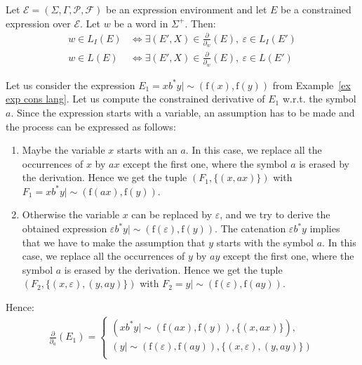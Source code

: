 \documentclass[a4paper]{llncs}
\begin{document}
  \begin{corollary}
    Let $\mathcal{E}=(\Sigma,\Gamma,\mathcal{P},\mathcal{F})$ be an expression environment and let $E$ be a constrained expression over $\mathcal{E}$. Let $w$ be a word in $\Sigma^+$. Then:
        \begin{align*}
          w \in L_{I}(E) &\Leftrightarrow \exists (E',X)\in\frac{\partial}{\partial_w}(E),\ \varepsilon\in L_I(E')\\
          w \in L(E) &\Leftrightarrow \exists (E',X)\in\frac{\partial}{\partial_w}(E),\ \varepsilon\in L(E')
        \end{align*}
  \end{corollary} 
  
  \begin{example}\label{ex derivativ}
    Let us consider the expression $E_1=xb^*y\mid \sim(\mathrm{f}(x),\mathrm{f}(y))$ from Example~\ref{ex exp cons lang}. Let us compute the constrained derivative of $E_1$ w.r.t. the symbol $a$. Since the expression starts with a variable, an assumption has to be made and the process can be expressed as follows: 
    \begin{enumerate}
      \item Maybe the variable $x$ starts with an $a$. In this case, we replace all the occurrences of $x$ by $ax$ except the first one, where the symbol $a$ is erased by the derivation. Hence we get the tuple $(F_1,\{(x,ax)\})$ with $F_1=xb^*y\mid \sim(\mathrm{f}(ax),\mathrm{f}(y))$.
      \item Otherwise the variable $x$ can be replaced by $\varepsilon$, and we try to derive the obtained expression $\varepsilon b^*y\mid \sim(\mathrm{f}(\varepsilon),\mathrm{f}(y))$. The catenation $\varepsilon b^*y$ implies that we have to make the assumption that $y$ starts with the symbol $a$. In this case, we replace all the occurrences of $y$ by $ay$ except the first one, where the symbol $a$ is erased by the derivation. Hence we get the tuple $(F_2,\{(x,\varepsilon),(y,ay)\})$ with $F_2=y\mid \sim(\mathrm{f}(\varepsilon),\mathrm{f}(ay))$.
    \end{enumerate}    
    Hence:
        \begin{align*}
        \frac{\partial}{\partial_a}(E_1)=
      \begin{cases}
          (xb^*y\mid \sim(\mathrm{f}(ax),\mathrm{f}(y)),\{(x,ax)\}),\\
          (y\mid \sim(\mathrm{f}(\varepsilon),\mathrm{f}(ay)),\{(x,\varepsilon),(y,ay)\})\\

\end{cases}
\end{align*}
\end{example}
\end{document}

